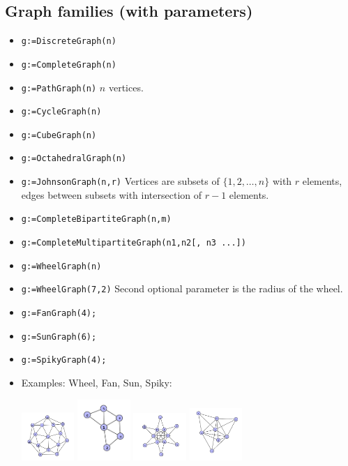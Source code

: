 \documentclass[11pt]{article}
\begin{document}
\begin{multicols}{3}
\section{Graph families (with parameters)}
\label{sec:orgheadline2}

\begin{itemize}
\item \texttt{g:=DiscreteGraph(n)}
\item \texttt{g:=CompleteGraph(n)}
\item \texttt{g:=PathGraph(n)} \(n\) vertices.
\item \texttt{g:=CycleGraph(n)}
\item \texttt{g:=CubeGraph(n)}
\item \texttt{g:=OctahedralGraph(n)}
\item \texttt{g:=JohnsonGraph(n,r)} Vertices are subsets of \(\{1,2,\ldots,n\}\)
with \(r\) elements, edges between subsets with intersection of
\(r-1\) elements.
\item \texttt{g:=CompleteBipartiteGraph(n,m)}
\item \texttt{g:=CompleteMultipartiteGraph(n1,n2[, n3 ...])}
\item \texttt{g:=WheelGraph(n)}
\item \texttt{g:=WheelGraph(7,2)} Second optional parameter is the radius of the
wheel.
\item \texttt{g:=FanGraph(4);}
\item \texttt{g:=SunGraph(6);}
\item \texttt{g:=SpikyGraph(4);}
\item Examples: Wheel, Fan, Sun, Spiky:

\includegraphics[width=2cm]{wheel.png} \includegraphics[width=2cm]{fan.png} \includegraphics[width=2cm]{sun.png} \includegraphics[width=2cm]{spiky.png}
\end{itemize}


\end{multicols}
\end{document}
